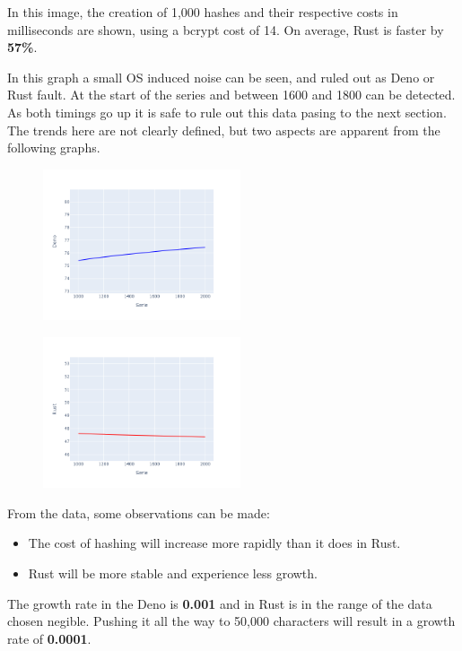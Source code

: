 \documentclass[10pt,journal,compsoc]{IEEEtran}
\begin{document}
In this image, the creation of 1,000 hashes and their respective costs in milliseconds are shown, using a bcrypt cost of 14. On average, Rust is faster by \textbf{57\%}.

In this graph a small OS induced noise can be seen, and ruled out as Deno or Rust fault. At the start of the series and between 1600 and 1800 can be detected. As both timings go up it is safe to rule out this data pasing to the next section.
The trends here are not clearly defined, but two aspects are apparent from the following graphs.

\begin{figure}[H]
    \centering
    \includegraphics[width=0.52\textwidth]{trend_hash_deno}
\end{figure}

\begin{figure}[H]
    \centering
    \includegraphics[width=0.52\textwidth]{images/trend_hash_rust.png}
\end{figure}

From the data, some observations can be made:
\begin{itemize}
    \item The cost of hashing will increase more rapidly than it does in Rust.
    \item Rust will be more stable and experience less growth.
\end{itemize}

The growth rate in the Deno is \textbf{0.001} and in Rust is in the range of the data chosen negible. Pushing it all the way to 50,000 characters will result in a growth rate of \textbf{0.0001}.
\end{document}
